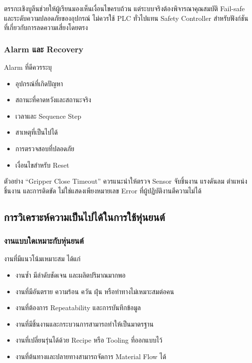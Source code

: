 ตรรกะเชิงบูลีนช่วยให้ผู้เรียนมองเห็นเงื่อนไขครบถ้วน แต่ระบบจริงต้องพิจารณาคุณสมบัติ Fail-safe และระดับความปลอดภัยของอุปกรณ์ ไม่ควรใช้ PLC ทั่วไปแทน Safety Controller สำหรับฟังก์ชันที่เกี่ยวกับการลดความเสี่ยงโดยตรง

\subsubsection{Alarm และ Recovery}

Alarm ที่ดีควรระบุ

\begin{itemize}
    \item อุปกรณ์ที่เกิดปัญหา
    \item สถานะที่คาดหวังและสถานะจริง
    \item เวลาและ Sequence Step
    \item สาเหตุที่เป็นไปได้
    \item การตรวจสอบที่ปลอดภัย
    \item เงื่อนไขสำหรับ Reset
\end{itemize}

ตัวอย่าง “Gripper Close Timeout” ควรแนะนำให้ตรวจ Sensor จับชิ้นงาน แรงดันลม ตำแหน่งชิ้นงาน และการติดขัด ไม่ใช่แสดงเพียงหมายเลข Error ที่ผู้ปฏิบัติงานตีความไม่ได้



\subsection{การวิเคราะห์ความเป็นไปได้ในการใช้หุ่นยนต์}

\subsubsection{งานแบบใดเหมาะกับหุ่นยนต์}

งานที่มีแนวโน้มเหมาะสม ได้แก่

\begin{itemize}
    \item งานซ้ำ มีลำดับชัดเจน และผลิตปริมาณมากพอ
    \item งานที่มีอันตราย ความร้อน ควัน ฝุ่น หรือท่าทางไม่เหมาะสมต่อคน
    \item งานที่ต้องการ Repeatability และการบันทึกข้อมูล
    \item งานที่มีชิ้นงานและกระบวนการสามารถทำให้เป็นมาตรฐาน
    \item งานที่เปลี่ยนรุ่นได้ด้วย Recipe หรือ Tooling ที่ออกแบบไว้
    \item งานที่ต้นทางและปลายทางสามารถจัดการ Material Flow ได้
\end{itemize}

